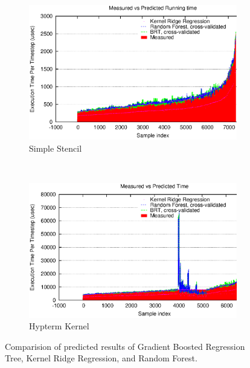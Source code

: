 \begin{figure}[h]
  \centering
  \begin{subfigure}[b]{0.8\textwidth}
    \centering
    \includegraphics[width=\textwidth]{images/simple-cmp}
    \caption{Simple Stencil}
    \label{fig:simple-compare}
  \end{subfigure}
  ~ %
  \begin{subfigure}[b]{0.8\textwidth}
    \centering
    \includegraphics[width=\textwidth]{images/hypterm-cmp}
    \caption{Hypterm Kernel}
    \label{fig:hypterm-compare}
  \end{subfigure}
  \caption{Comparision of predicted results of Gradient Boosted Regression Tree, Kernel Ridge Regression, and Random Forest.}
\label{fig:compare}
\end{figure}

